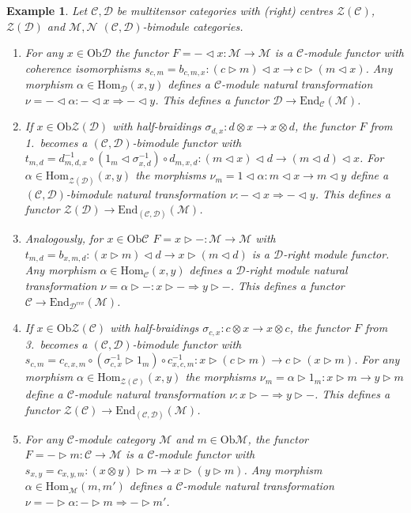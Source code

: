 \documentclass[1.5pt, a4paper]{article}
\newcommand{\mac}{\mathcal C}
\newcommand{\mad}{\mathcal D}
\newcommand{\mam}{\mathcal M}
\newcommand{\man}{\mathcal N}
\newcommand{\Hom}{\mathrm{Hom}}
\newcommand{\End}{\mathrm{End}}
\newcommand{\Ob}{\mathrm{Ob}}
\newcommand{\inv}[0]{{-1}}
\newcommand{\oo}[0]{\otimes}
\newtheorem{example}[theorem]{Example}
\begin{document}
\begin{example}\label{ex:modulefuncs} Let $\mac,\mad$ be  multitensor categories with (right) centres $\mathcal Z(\mac)$, $\mathcal Z(\mad)$ and $\mam,\man$ $(\mac,\mad)$-bimodule categories. 
\begin{enumerate}
\item  For any $x\in\Ob \mad$ the functor
$F=-\lhd x: \mam\to\mam$  is a $\mac$-module functor with coherence isomorphisms $s_{c,m}=b_{c,m,x}: (c\rhd m)\lhd x\to c\rhd (m\lhd x)$. Any morphism  $\alpha\in \Hom_\mad(x,y)$ defines a $\mac$-module natural transformation $\nu=-\lhd \alpha: -\lhd x\Rightarrow -\lhd y$. This defines a functor $\mad\to \End_\mac(\mam)$.

\item If $x\in \Ob \mathcal Z(\mad)$ with half-braidings $\sigma_{d,x}: d\oo x\to x\oo d$,  the functor $F$ from 1.~becomes  a $(\mac,\mad)$-bimodule functor with $t_{m,d}= d_{m,d,x}^\inv\circ (1_m\lhd \sigma_{x,d}^\inv)\circ d_{m,x,d}: (m\lhd x)\lhd d\to (m\lhd d)\lhd x$.
For $\alpha\in \Hom_{\mathcal Z(\mad)}(x,y)$ the morphisms $\nu_m=1\lhd \alpha: m\lhd x\to m\lhd y$ define a $(\mac,\mad)$-bimodule natural transformation $\nu: -\lhd x\Rightarrow -\lhd y$. 
This defines a functor $\mathcal Z(\mad)\to \End_{(\mac,\mad)}(\mam)$.

\item Analogously, for  $x\in \Ob\mac$  $F=x\rhd -: \mam\to\mam$    with $t_{m,d}=b_{x,m,d}: (x\rhd m)\lhd d\to x\rhd (m\lhd d)$ is a $\mad$-right module functor. Any morphism  $\alpha\in \Hom_\mac(x,y)$  defines a $\mad$-right module natural transformation $\nu=\alpha\rhd -: x\rhd -\Rightarrow y\rhd -$. This defines a functor $\mac\to \End_{\mad^{rev}}(\mam)$.  
 
 
\item If  $x\in\Ob \mathcal Z(\mac)$ with half-braidings $\sigma_{c,x}: c\oo x\to x\oo c$, the functor $F$ from 3.~becomes a  $(\mac,\mad)$-bimodule functor with $s_{c,m}=c_{c,x,m}\circ (\sigma^\inv_{c,x}\rhd 1_m)\circ c_{x,c,m}^\inv: x\rhd (c\rhd m)\to c\rhd (x\rhd m)$. 
For any morphism $\alpha\in \Hom_{\mathcal Z(\mac)}(x,y)$ the morphisms $\nu_m=\alpha\rhd 1_m: x\rhd m\to y\rhd m$ define a $\mac$-module natural transformation $\nu: x\rhd-\Rightarrow y\rhd -$. This defines a functor $\mathcal Z(\mac)\to \mathrm{End}_{(\mac,\mad)}(\mam)$. 

\item For any $\mac$-module category $\mam$ and $m\in\Ob \mam$, the functor $F=-\rhd m:\mac\to\mam$ is a $\mac$-module functor with $s_{x,y}=c_{x,y,m}: (x\oo y)\rhd m\to x\rhd (y\rhd m)$. Any morphism $\alpha\in \Hom_\mam(m,m')$ defines a $\mac$-module natural transformation $\nu=-\rhd \alpha: -\rhd m\Rightarrow -\rhd m'$. 


\end{enumerate}
\end{example}
\end{document}

